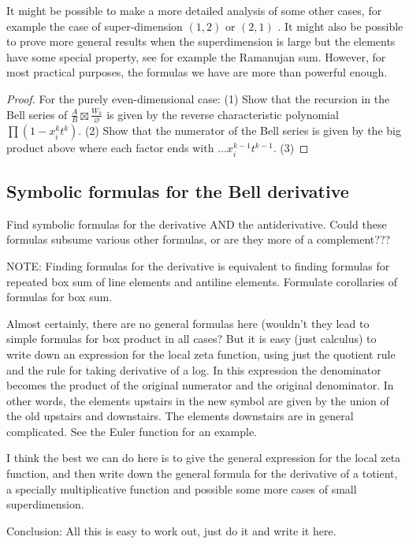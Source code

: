 \documentclass[a4paper]{article}
\begin{document}
\begin{remark}
It might be possible to make a more detailed analysis of some other cases, for example the case of super-dimension $(1, 2)$ or $(2, 1)$ . It might also be possible to prove more general results when the superdimension is large but the elements have some special property, see for example the Ramanujan sum. However, for most practical purposes, the formulas we have are more than powerful enough.
\end{remark}


\begin{proof}
For the purely even-dimensional case: (1) Show that the recursion in the Bell series of $\frac{A}{B} \boxtimes \frac{W_k}{\varnothing}$ is given by the reverse characteristic polynomial $\prod (1-x_i^k t^k)$. (2) Show that the numerator of the Bell series is given by the big product above where each factor ends with $\ldots x_i^{k-1} t^{k-1}$. (3) 
\end{proof}



\subsection{Symbolic formulas for the Bell derivative}

\begin{theorem}
Find symbolic formulas for the derivative AND the antiderivative. Could these formulas subsume various other formulas, or are they more of a complement???

NOTE: Finding formulas for the derivative is equivalent to finding formulas for repeated box sum of line elements and antiline elements. Formulate corollaries of formulas for box sum.
 
Almost certainly, there are no general formulas here (wouldn't they lead to simple formulas for box product in all cases? But it is easy (just calculus) to write down an expression for the local zeta function, using just the quotient rule and the rule for taking derivative of a log. In this expression the denominator becomes the product of the original numerator and the original denominator. In other words, the elements upstairs in the new symbol are given by the union of the old upstairs and downstairs. The elements downstairs are in general complicated. See the Euler function for an example.

I think the best we can do here is to give the general expression for the local zeta function, and then write down the general formula for the derivative of a totient, a specially multiplicative function and possible some more cases of small superdimension.

Conclusion: All this is easy to work out, just do it and write it here.
\end{theorem}
\end{document}
